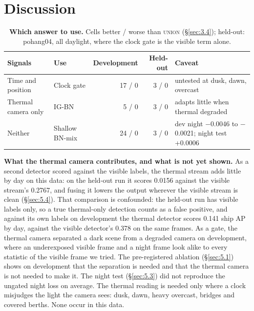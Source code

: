 \documentclass[10pt]{article}
\begin{document}
\section{Discussion}\label{sec:7}
\begin{table}[htbp]
\centering
\small
\caption{\textbf{Which answer to use.} Cells better / worse than \textsc{union} (\S\ref{sec:3.4}); held-out: pohang04, all daylight, where the clock gate is the visible term alone.}
\label{tab:23}
\begin{tabularx}{\linewidth}{llrr>{\raggedright\arraybackslash}X}
\toprule
Signals & Use & Development & Held-out & Caveat \\
\midrule
Time and position & Clock gate & 17 / 0 & 3 / 0 & untested at dusk, dawn, overcast \\
Thermal camera only & IG-BN & 5 / 0 & 3 / 0 & adapts little when thermal degraded \\
Neither & Shallow BN-mix & 24 / 0 & 3 / 0 & dev night $-$0.0046 to $-$0.0021; night test +0.0006 \\
\bottomrule
\end{tabularx}
\end{table}
\textbf{What the thermal camera contributes, and what is not yet shown.} As a second detector scored against the visible labels, the thermal stream adds little by day on this data: on the held-out run it scores 0.0156 against the visible stream's 0.2767, and fusing it lowers the output wherever the visible stream is clean (\S\ref{sec:5.4}). That comparison is confounded: the held-out run has visible labels only, so a true thermal-only detection counts as a false positive, and against its own labels on development the thermal detector scores 0.141 ship AP by day, against the visible detector's 0.378 on the same frames. As a gate, the thermal camera separated a dark scene from a degraded camera on development, where an underexposed visible frame and a night frame look alike to every statistic of the visible frame we tried. The pre-registered ablation (\S\ref{sec:5.1}) shows on development that the separation is needed and that the thermal camera is not needed to make it. The night test (\S\ref{sec:5.3}) did not reproduce the ungated night loss on average. The thermal reading is needed only where a clock misjudges the light the camera sees: dusk, dawn, heavy overcast, bridges and covered berths. None occur in this data.
\end{document}
